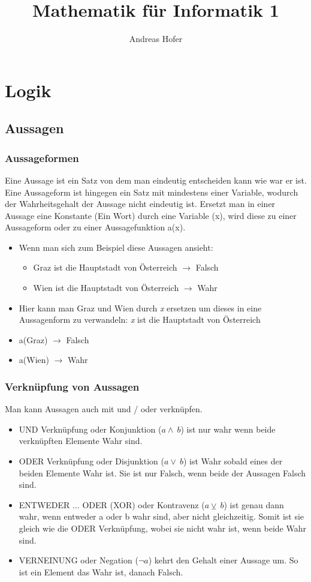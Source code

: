 \documentclass{article}
\title{\vspace{-1cm}Mathematik für Informatik 1}
\author{Andreas Hofer}
\begin{document}
	\maketitle
	\tableofcontents
	\newpage
	\section{Logik}
	\subsection{Aussagen}
	\subsubsection{Aussageformen}
	Eine Aussage ist ein Satz von dem man eindeutig entscheiden kann wie war er ist. \\
	Eine Aussageform ist hingegen ein Satz mit mindestens einer Variable, wodurch der Wahrheitsgehalt der Aussage nicht eindeutig ist. Ersetzt man in einer Aussage eine Konstante (Ein Wort) durch eine Variable (x), wird diese zu einer Aussageform oder zu einer Aussagefunktion a(x).
	\begin{itemize}
		\item{Wenn man sich zum Beispiel diese Aussagen ansieht:}
		\begin{itemize}
			\item{Graz ist die Hauptstadt von Österreich $\to$ Falsch}
			\item{Wien ist die Hauptstadt von Österreich $\to$ Wahr}
		\end{itemize}
		\item{Hier kann man Graz und Wien durch \textit{x} ersetzen um dieses in eine Aussagenform zu verwandeln: \textit{x} ist die Hauptstadt von Österreich}
		\item{a(Graz) $\to$ Falsch}
		\item{a(Wien) $\to$ Wahr}
	\end{itemize}
	\subsubsection{Verknüpfung von Aussagen}
	Man kann Aussagen auch mit und / oder verknüpfen.
	\begin{itemize}
		\item{UND Verknüpfung oder Konjunktion ($a \land\  b$) ist nur wahr wenn beide verknüpften Elemente Wahr sind.}
		\item{ODER Verknüpfung oder Disjunktion ($a \lor\  b$) ist Wahr sobald eines der beiden Elemente Wahr ist. Sie ist nur Falsch, wenn beide der Aussagen Falsch sind.}
		\item{ENTWEDER ... ODER (XOR) oder Kontravenz ($a \veebar\  b$) ist genau dann wahr, wenn entweder a oder b wahr sind, aber nicht gleichzeitig. Somit ist sie gleich wie die ODER Verknüpfung, wobei sie nicht wahr ist, wenn beide Wahr sind.}
		\item{VERNEINUNG oder Negation ($\neg  a$) kehrt den Gehalt einer Aussage um. So ist ein Element das Wahr ist, danach Falsch.}
	\end{itemize}
\end{document}
